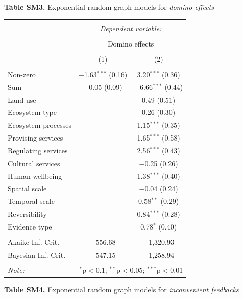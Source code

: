 \documentclass[9pt,]{article}
\begin{document}
\endgroup

\textbf{Table SM3.} Exponential random graph models for
\textit{domino effects} \begingroup  \small 

\begin{tabular}{@{\extracolsep{5pt}}lcc} 
\\[-1.8ex]\hline 
\hline \\[-1.8ex] 
 & \multicolumn{2}{c}{\textit{Dependent variable:}} \\ 
\cline{2-3} 
\\[-1.8ex] & \multicolumn{2}{c}{Domino effects} \\ 
\\[-1.8ex] & (1) & (2)\\ 
\hline \\[-1.8ex] 
 Non-zero & $-$1.63$^{***}$ (0.16) & 3.20$^{***}$ (0.36) \\ 
  Sum & $-$0.05 (0.09) & $-$6.66$^{***}$ (0.44) \\ 
  Land use &  & 0.49 (0.51) \\ 
  Ecosystem type &  & 0.26 (0.30) \\ 
  Ecosystem processes &  & 1.15$^{***}$ (0.35) \\ 
  Provising services &  & 1.65$^{***}$ (0.58) \\ 
  Regulating services &  & 2.56$^{***}$ (0.43) \\ 
  Cultural services &  & $-$0.25 (0.26) \\ 
  Human wellbeing &  & 1.38$^{***}$ (0.40) \\ 
  Spatial scale &  & $-$0.04 (0.24) \\ 
  Temporal scale &  & 0.58$^{**}$ (0.29) \\ 
  Reversibility &  & 0.84$^{***}$ (0.28) \\ 
  Evidence type &  & 0.78$^{*}$ (0.40) \\ 
 \hline \\[-1.8ex] 
Akaike Inf. Crit. & $-$556.68 & $-$1,320.93 \\ 
Bayesian Inf. Crit. & $-$547.15 & $-$1,258.94 \\ 
\hline 
\hline \\[-1.8ex] 
\textit{Note:}  & \multicolumn{2}{r}{$^{*}$p$<$0.1; $^{**}$p$<$0.05; $^{***}$p$<$0.01} \\ 
\end{tabular}

\endgroup

\textbf{Table SM4.} Exponential random graph models for
\textit{inconvenient feedbacks} \begingroup  \small 
\end{document}
